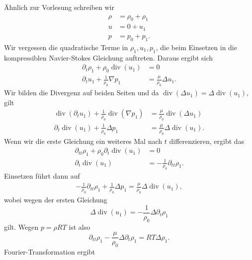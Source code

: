 \documentclass[12pt]{exam}
\newcommand{\del}{\partial}
\newcommand{\vdiv}{\operatorname{div}}
\begin{document}
\begin{questions}
    \begin{solution}
        Ähnlich zur Vorlesung schreiben wir 
        \begin{align*}
            \rho &= \rho_0 + \rho_1 \\
            u &= 0 + u_1 \\
            p &= p_0 + p_1.
        \end{align*}
        Wir vergessen die quadratische Terme in $\rho_1, u_1, p_1$, die beim Einsetzen in die kompressiblen Navier-Stokes Gleichung auftreten. Daraus ergibt sich
        \begin{align*}
            \del_t \rho_1 + \rho_0 \vdiv(u_1) &= 0 \\
            \del_t u_1 + \frac{1}{\rho_0} \nabla p_1 &= \frac{\mu}{\rho_0} \Delta u_1.
        \end{align*}
        Wir bilden die Divergenz auf beiden Seiten und da $\vdiv(\Delta u_1) = \Delta \vdiv(u_1)$, gilt
        \begin{align*}
            \vdiv(\del_t u_1) + \frac{1}{\rho_0} \vdiv(\nabla p_1) &= \frac{\mu}{\rho_0} \vdiv(\Delta u_1) \\
            \del_t \vdiv(u_1) + \frac{1}{\rho_0} \Delta p_1 &= \frac{\mu}{\rho_0} \Delta \vdiv(u_1).
        \end{align*}
        Wenn wir die erste Gleichung ein weiteres Mal nach $t$ differenzieren, ergibt das
        \begin{align*}
            \del_{tt} \rho_1 + \rho_0 \del_t \vdiv(u_1) &= 0 \\
            \del_t \vdiv(u_1) &= -\frac{1}{\rho_0} \del_{tt} \rho_1.
        \end{align*}
        Einsetzen führt dann auf
        \begin{align*}
            -\frac{1}{\rho_0} \del_{tt} \rho_1 + \frac{1}{\rho_0} \Delta p_1 = \frac{\mu}{\rho_0} \Delta \vdiv(u_1),
        \end{align*}
        wobei wegen der ersten Gleichung
        \begin{equation*}
            \Delta \vdiv(u_1) = -\frac{1}{\rho_0} \Delta \del_t \rho_1
        \end{equation*}
        gilt. Wegen $p = \rho R T$ ist also
        \begin{equation*}
            \del_{tt} \rho_1 - \frac{\mu}{\rho_0} \Delta \del_t \rho_1 = RT \Delta \rho_1.
        \end{equation*}
        Fourier-Transformation ergibt
        \begin{equation*}

\end{equation*}
\end{solution}
\end{questions}
\end{document}
